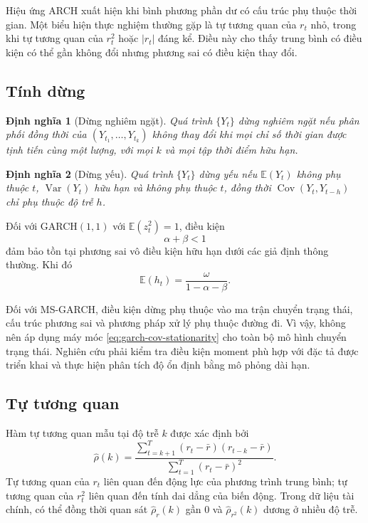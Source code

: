 \documentclass[12pt,a4paper]{article}
\numberwithin{equation}{section}
\newtheorem{definition}{Định nghĩa}[section]
\newcommand{\E}{\mathbb{E}}
\newcommand{\Var}{\operatorname{Var}}
\newcommand{\Cov}{\operatorname{Cov}}
\begin{document}
Hiệu ứng ARCH xuất hiện khi bình phương phần dư có cấu trúc phụ thuộc thời gian. Một biểu hiện thực nghiệm thường gặp là tự tương quan của $r_t$ nhỏ, trong khi tự tương quan của $r_t^2$ hoặc $|r_t|$ đáng kể. Điều này cho thấy trung bình có điều kiện có thể gần không đổi nhưng phương sai có điều kiện thay đổi.

\subsection{Tính dừng}\label{subsec:stationarity}

\begin{definition}[Dừng nghiêm ngặt]
Quá trình $\{Y_t\}$ dừng nghiêm ngặt nếu phân phối đồng thời của $(Y_{t_1},\ldots,Y_{t_k})$ không thay đổi khi mọi chỉ số thời gian được tịnh tiến cùng một lượng, với mọi $k$ và mọi tập thời điểm hữu hạn.
\end{definition}

\begin{definition}[Dừng yếu]
Quá trình $\{Y_t\}$ dừng yếu nếu $\E(Y_t)$ không phụ thuộc $t$, $\Var(Y_t)$ hữu hạn và không phụ thuộc $t$, đồng thời $\Cov(Y_t,Y_{t-h})$ chỉ phụ thuộc độ trễ $h$.
\end{definition}

Đối với GARCH$(1,1)$ với $\E(z_t^2)=1$, điều kiện
\begin{equation}
  \alpha+\beta<1
  \label{eq:garch-cov-stationarity}
\end{equation}
đảm bảo tồn tại phương sai vô điều kiện hữu hạn dưới các giả định thông thường. Khi đó
\begin{equation}
  \E(h_t)=\frac{\omega}{1-\alpha-\beta}.
  \label{eq:garch-unconditional-var}
\end{equation}

Đối với MS-GARCH, điều kiện dừng phụ thuộc vào ma trận chuyển trạng thái, cấu trúc phương sai và phương pháp xử lý phụ thuộc đường đi. Vì vậy, không nên áp dụng máy móc \cref{eq:garch-cov-stationarity} cho toàn bộ mô hình chuyển trạng thái. Nghiên cứu phải kiểm tra điều kiện moment phù hợp với đặc tả được triển khai và thực hiện phân tích độ ổn định bằng mô phỏng dài hạn.

\subsection{Tự tương quan}\label{subsec:autocorrelation}

Hàm tự tương quan mẫu tại độ trễ $k$ được xác định bởi
\begin{equation}
  \widehat\rho(k)
  =
  \frac{\sum_{t=k+1}^{T}(r_t-\bar r)(r_{t-k}-\bar r)}
       {\sum_{t=1}^{T}(r_t-\bar r)^2}.
  \label{eq:sample-acf}
\end{equation}
Tự tương quan của $r_t$ liên quan đến động lực của phương trình trung bình; tự tương quan của $r_t^2$ liên quan đến tính dai dẳng của biến động. Trong dữ liệu tài chính, có thể đồng thời quan sát $\widehat\rho_r(k)$ gần $0$ và $\widehat\rho_{r^2}(k)$ dương ở nhiều độ trễ.
\end{document}
